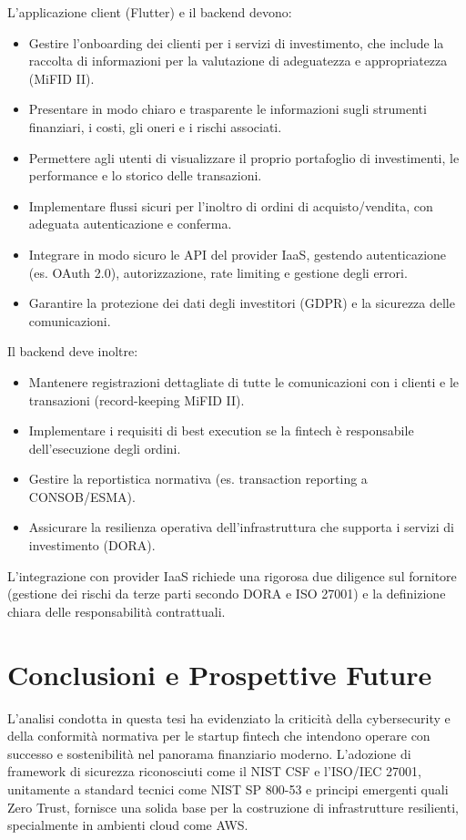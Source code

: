 L'applicazione client (Flutter) e il backend devono:
\begin{itemize}
    \item Gestire l'onboarding dei clienti per i servizi di investimento, che include la raccolta di informazioni per la valutazione di adeguatezza e appropriatezza (MiFID II).
    \item Presentare in modo chiaro e trasparente le informazioni sugli strumenti finanziari, i costi, gli oneri e i rischi associati.
    \item Permettere agli utenti di visualizzare il proprio portafoglio di investimenti, le performance e lo storico delle transazioni.
    \item Implementare flussi sicuri per l'inoltro di ordini di acquisto/vendita, con adeguata autenticazione e conferma.
    \item Integrare in modo sicuro le API del provider IaaS, gestendo autenticazione (es. OAuth 2.0), autorizzazione, rate limiting e gestione degli errori.
    \item Garantire la protezione dei dati degli investitori (GDPR) e la sicurezza delle comunicazioni.
\end{itemize}
Il backend deve inoltre:
\begin{itemize}
    \item Mantenere registrazioni dettagliate di tutte le comunicazioni con i clienti e le transazioni (record-keeping MiFID II).
    \item Implementare i requisiti di best execution se la fintech è responsabile dell'esecuzione degli ordini.
    \item Gestire la reportistica normativa (es. transaction reporting a CONSOB/ESMA).
    \item Assicurare la resilienza operativa dell'infrastruttura che supporta i servizi di investimento (DORA).
\end{itemize}
L'integrazione con provider IaaS richiede una rigorosa due diligence sul fornitore (gestione dei rischi da terze parti secondo DORA e ISO 27001) e la definizione chiara delle responsabilità contrattuali.

\chapter{Conclusioni e Prospettive Future}
\label{chap:conclusioni}

L'analisi condotta in questa tesi ha evidenziato la criticità della cybersecurity e della conformità normativa per le startup fintech che intendono operare con successo e sostenibilità nel panorama finanziario moderno. L'adozione di framework di sicurezza riconosciuti come il NIST CSF e l'ISO/IEC 27001, unitamente a standard tecnici come NIST SP 800-53 e principi emergenti quali Zero Trust, fornisce una solida base per la costruzione di infrastrutture resilienti, specialmente in ambienti cloud come AWS.

